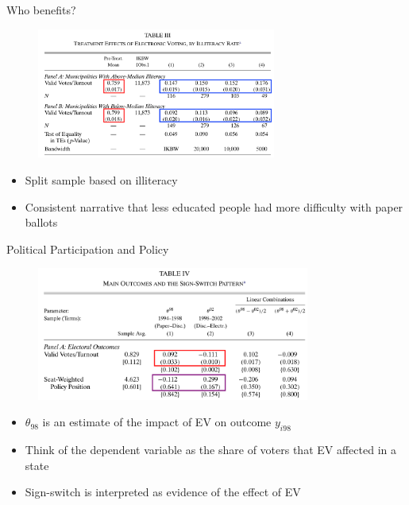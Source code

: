 \documentclass[11pt,notes=hide,aspectratio=169,mathserif]{beamer}
\begin{document}
\begin{frame}{Who benefits?}
\begin{figure}
\centering
\includegraphics[width=0.7\textwidth]{inputs/fig6.png}
\end{figure}
\begin{itemize}
\pause \item Split sample based on illiteracy
\pause \item Consistent narrative that less educated people had more difficulty with paper ballots
\end{itemize}
\end{frame}

\begin{frame}{Political Participation and Policy}
\begin{figure}
\centering
\includegraphics[width=0.8\textwidth]{inputs/fig7.png}
\end{figure}
\begin{itemize}
\pause \item $\theta_{98}$ is an estimate of the impact of EV on outcome $y_{i98}$
\pause \item Think of the dependent variable as the share of voters that EV affected in a state
\pause \item Sign-switch is interpreted as evidence of the effect of EV
\end{itemize}
\end{frame}
\end{document}
